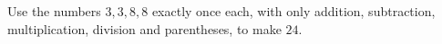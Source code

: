 Use the numbers $3,3,8,8$ exactly once each, with only addition, subtraction, multiplication, division and parentheses, to make $24$.
